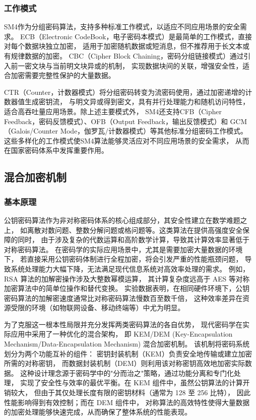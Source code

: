 \subsubsection{工作模式}

SM4作为分组密码算法，支持多种标准工作模式，以适应不同应用场景的安全需求。
ECB（Electronic CodeBook，电子密码本模式）是最简单的工作模式，直接对每个数据块独立加密，
适用于加密随机数据或短消息，但不推荐用于长文本或有规律数据的加密。
CBC（Cipher Block Chaining，密码分组链接模式）通过引入前一密文块与当前明文块异或的机制，
实现数据块间的关联，增强安全性，适合加密需要完整性保护的大量数据。

CTR（Counter，计数器模式）将分组密码转变为流密码使用，通过加密递增的计数器值生成密钥流，
与明文异或得到密文，具有并行处理能力和随机访问特性，适合高吞吐量应用场景。除上述主要模式外，
SM4还支持CFB（Cipher Feedback，密码反馈模式）、OFB（Output Feedback，输出反馈模式）和
GCM（Galois/Counter Mode，伽罗瓦/计数器模式）等其他标准分组密码工作模式。
这些多样化的工作模式使SM4算法能够灵活应对不同应用场景的安全需求，
从而在国家密码体系中发挥重要作用。

\subsection{混合加密机制}
\subsubsection{基本原理}
公钥密码算法作为非对称密码体系的核心组成部分，其安全性建立在数学难题之上，
如离散对数问题、整数分解问题或格问题等。这类算法在提供高强度安全保障的同时，
由于涉及复杂的代数运算和高阶数学计算，导致其计算效率显著低于对称密码算法。
在密码学的实际应用场景中，尤其是需要加密大量数据的环境下，
若直接采用公钥密码体制进行全程加密，将会引发严重的性能瓶颈问题，
导致系统处理能力大幅下降，无法满足现代信息系统对高效率处理的需求。
例如，RSA 算法的加解密操作涉及大整数幂模运算，
其计算复杂度远高于 AES 等对称加密算法中的简单位操作和替代变换。
实验数据表明，在相同硬件环境下，公钥密码算法的加解密速度通常比对称密码算法慢数百至数千倍，
这种效率差异在资源受限的环境（如物联网设备、移动终端等）中尤为明显。

为了克服这一根本性局限并充分发挥两类密码算法的各自优势，
现代密码学在实际应用中采用了一种优化的混合架构，
即 KEM/DEM (Key-Encapsulation Mechanism/Data-Encapsulation Mechanism) 混合加密机制。
该机制将密码系统划分为两个功能互补的组件：
密钥封装机制（KEM）负责安全地传输或建立加密所需的对称密钥，
而数据封装机制（DEM）则利用该对称密钥高效地加密实际数据。
这种设计理念源于密码学中的"分而治之"策略，通过功能分离和专门化处理，
实现了安全性与效率的最优平衡。在 KEM 组件中，虽然公钥算法的计算开销较大，
但由于其仅处理长度有限的密钥材料（通常为 128 至 256 比特），
因此性能影响得到有效控制；而在 DEM 组件中，
对称算法的高效特性使得大量数据的加密处理能够快速完成，从而确保了整体系统的性能表现。

